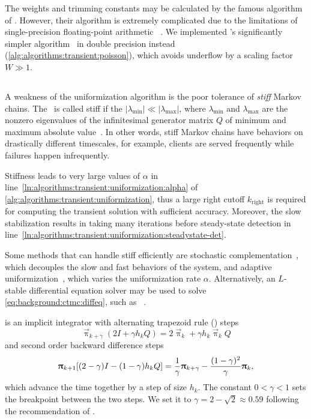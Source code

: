 The weights and trimming constants may be calculated by the famous
algorithm of \citet{DBLP:journals/cacm/FoxG88}. However, their
algorithm is extremely complicated due to the limitations of
single-precision floating-point arithmetic%
~\citep{jansen2011understanding}. We implemented
\citeauthor{DBLP:journals/corr/Burak14}'s significantly simpler
algorithm~\citep{DBLP:journals/corr/Burak14} in double precision
instead (\vref{alg:algorithms:transient:poisson}), which avoids
underflow by a scaling factor $W \gg 1$.

\subsection{}
\label{ssec:algorithms:trbdf2}

A weakness of the uniformization algorithm is the poor tolerance of
\emph{stiff} Markov chains. The \CTMC\ is called stiff if the
$\lvert \lambda_{\min} \rvert \ll \lvert \lambda_{\max} \rvert$, where
$\lambda_{\min}$ and $\lambda_{\max}$ are the nonzero eigenvalues of
the infinitesimal generator matrix $Q$ of minimum and maximum absolute
value~\citep{DBLP:journals/cor/ReibmanT88}. In other words, stiff
Markov chains have behaviors on drastically different timescales, for
example, clients are served frequently while failures happen
infrequently.

Stiffness leads to very large values of $\alpha$ in
line~\ref{ln:algorithms:transient:uniformization:alpha} of
\vref{alg:algorithms:transient:uniformization}, thus a large right
cutoff $k_{\text{right}}$ is required for computing the transient
solution with sufficient accuracy. Moreover, the slow stabilization
results in taking many iterations before steady-state detection in
line~\ref{ln:algorithms:transient:uniformization:steadystate-det}.

Some methods that can handle stiff  efficiently are
stochastic complementation~\citep{meyer1989stochastic}, which
decouples the slow and fast behaviors of the system, and adaptive
uniformization~\citep{van1994adaptive}, which varies the uniformization
rate $\alpha$. Alternatively, an $L$-stable differential equation
solver may be used to solve \vref{eq:background:ctmc:diffeq}, such as
\mbox{}~\citep{DBLP:journals/cor/ReibmanT88,%
DBLP:journals/tcad/BankCFGRS85}.

 is an implicit integrator with alternating trapezoid
rule () steps
\begin{equation}
  \vec{\uppi}_{k + \gamma} (2I + \gamma h_k Q) = 2 \vec{\uppi}_{k} +
  \gamma h_k \vec{\uppi}_k Q
\end{equation}
and second order backward difference steps
\begin{equation}
  \vec{\uppi}_{k + 1} [(2 - \gamma) I - (1 - \gamma) h_k Q] =
  \frac{1}{\gamma} \vec{\uppi}_{k + \gamma} - \frac{(1 -
    \gamma)^2}{\gamma} \vec{\uppi}_k \text,
\end{equation}
which advance the time together by a step of size $h_k$. The constant
$0 < \gamma < 1$ sets the breakpoint between the two steps. We set it
to $\gamma = 2 - \sqrt{2} \approx 0.59$ following the recommendation
of \citet{DBLP:journals/tcad/BankCFGRS85}.

